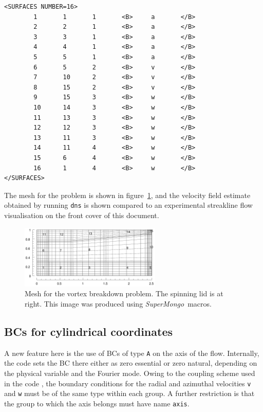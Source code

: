 \documentclass[11pt]{report}
\newcommand{\SM}{\emph{SuperMongo}}
\begin{document}
{\begin{verbatim}
<SURFACES NUMBER=16>
        1       1       1       <B>     a       </B>
        2       2       1       <B>     a       </B>
        3       3       1       <B>     a       </B>
        4       4       1       <B>     a       </B>
        5       5       1       <B>     a       </B>
        6       5       2       <B>     v       </B>
        7       10      2       <B>     v       </B>
        8       15      2       <B>     v       </B>
        9       15      3       <B>     w       </B>
        10      14      3       <B>     w       </B>
        11      13      3       <B>     w       </B>
        12      12      3       <B>     w       </B>
        13      11      3       <B>     w       </B>
        14      11      4       <B>     w       </B>
        15      6       4       <B>     w       </B>
        16      1       4       <B>     w       </B>
</SURFACES>
\end{verbatim}
}

The mesh for the problem is shown in figure~\ref{vb1msh}, and the
velocity field estimate obtained by running \verb|dns| is shown
compared to an experimental streakline flow visualisation on the front
cover of this document.
\begin{figure}
\begin{center}
\includegraphics[width=0.6\textwidth]{vb1mesh}
\end{center}
\caption{
\label{vb1msh}
  Mesh for the vortex breakdown problem.  The spinning lid is at
  right.  This image was produced using \SM\ macros.  }
\end{figure}

\subsection{BCs for cylindrical coordinates}
\label{sec.cbcs}

A new feature here is the use of BCs of type \verb+A+ on the axis of
the flow.  Internally, the code sets the BC there either as zero
essential or zero natural, depending on the physical variable and the
Fourier mode.  Owing to the coupling scheme used in the code
\citep{blsh04}, the boundary conditions for the radial and azimuthal
velocities \verb+v+ and \verb+w+ must be of the same type within each
group.  A further restriction is that the group to which the axis
belongs must have name \verb+axis+.
\end{document}
